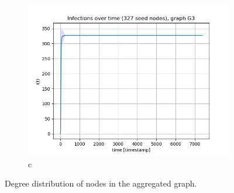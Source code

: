 \documentclass[letterpaper]{article}
\begin{document}
\begin{figure}
\begin{subfigure}[b]{0.32\textwidth}
        \includegraphics[width=\textwidth]{img/infections_G3.png}
        \caption{c}
	    \label{fig:degree_distribution_loglog}
    \end{subfigure}
    \caption{Degree distribution of nodes in the aggregated graph.}
    \label{fig:degree_distribution}
\end{figure}
\end{document}
